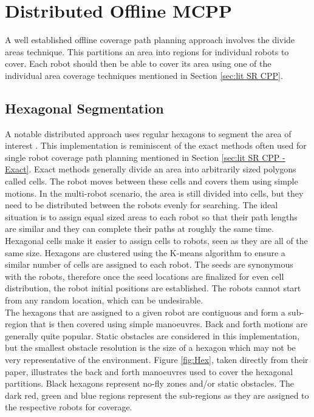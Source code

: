 \section{Distributed Offline MCPP}
\label{sec:lit Ditributed MCPP}
A well established offline coverage path planning approach involves the divide areas technique. This partitions an area into regions for individual robots to cover. Each robot should then be able to cover its area using one of the individual area coverage techniques mentioned in Section \ref{sec:lit SR CPP}.
\subsection{Hexagonal Segmentation}
A notable distributed approach uses regular hexagons to segment the area of interest \cite{Azpurua2018}. This implementation is reminiscent of the exact methods often used for single robot coverage path planning mentioned in Section \ref{sec:lit SR CPP - Exact}. Exact methods generally divide an area into arbitrarily sized polygons called cells. The robot moves between these cells and covers them using simple motions. In the multi-robot scenario, the area is still divided into cells, but they need to be distributed between the robots evenly for searching. The ideal situation is to assign equal sized areas to each robot so that their path lengths are similar and they can complete their paths at roughly the same time.\\
Hexagonal cells make it easier to assign cells to robots, seen as they are all of the same size. Hexagons are clustered using the K-means algorithm to ensure a similar number of cells are assigned to each robot. The seeds are synonymous with the robots, therefore once the seed locations are finalized for even cell distribution, the robot initial positions are established. The robots cannot start from any random location, which can be undesirable. \\
The hexagons that are assigned to a given robot are contiguous and form a sub-region that is then covered using simple manoeuvres. Back and forth motions are generally quite popular. Static obstacles are considered in this implementation, but the smallest obstacle resolution is the size of a hexagon which may not be very representative of the environment. Figure \ref{fig:Hex}, taken directly from their paper, illustrates the back and forth manoeuvres used to cover the hexagonal partitions. Black hexagons represent no-fly zones and/or static obstacles. The dark red, green and blue regions represent the sub-regions as they are assigned to the respective robots for coverage.\\
